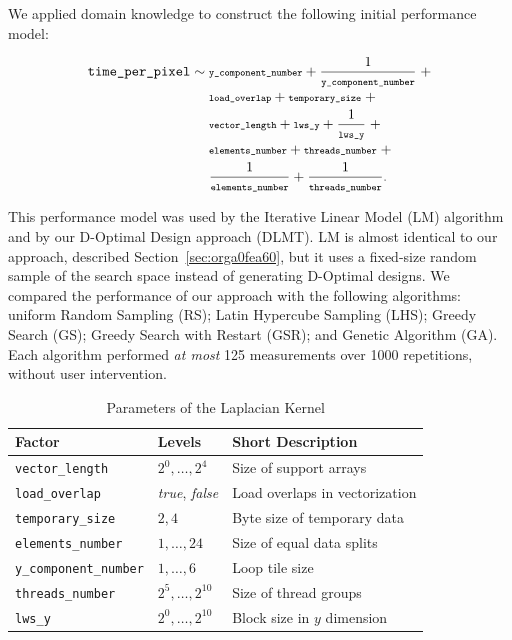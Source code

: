 \documentclass[conference]{IEEEtran}
\begin{document}
We applied domain knowledge to construct the following initial performance model:
\vspace{-2pt}
\\\begin{minipage}{\linewidth}\scriptsize
\begin{align}
\label{eq:gpu_laplacian_performance_model}
\texttt{time\_per\_pixel} \sim & \scriptsize\; \texttt{y\_component\_number} + \frac{1}{\texttt{y\_component\_number}} \; + \nonumber \\
& \scriptsize\; \texttt{load\_overlap} + \texttt{temporary\_size} \; + \nonumber \\
& \scriptsize\; \texttt{vector\_length} + \texttt{lws\_y} + \frac{1}{\texttt{lws\_y}} \; + \\
& \scriptsize\; \texttt{elements\_number} + \texttt{threads\_number}  \; + \nonumber \\
& \scriptsize\; \frac{1}{\texttt{elements\_number}} + \frac{1}{\texttt{threads\_number}}\text{.} \nonumber
\end{align}
\vspace{2pt}
\end{minipage}
This performance model was used by the Iterative Linear Model (LM) algorithm and
by our D-Optimal Design approach (DLMT). LM is almost identical to our approach,
described Section~\ref{sec:orga0fea60}, but it uses a
fixed-size random sample of the search space instead of generating D-Optimal
designs. We compared the performance of our approach with the following
algorithms: uniform Random Sampling (RS); Latin Hypercube Sampling (LHS); Greedy
Search (GS); Greedy Search with Restart (GSR); and Genetic Algorithm (GA). Each
algorithm performed \emph{at most} 125 measurements over 1000 repetitions, without
user intervention.

\begin{table}[t]
\caption{\label{tab:orgf6c9670}
Parameters of the Laplacian Kernel}
\centering
\scriptsize
\begin{tabular}{llp{}}
\toprule
Factor & Levels & Short Description\\
\midrule
\texttt{vector\_length} & \(2^0,\dots,2^4\) & Size of support arrays\\
\texttt{load\_overlap} & \textit{true}, \textit{false} & Load overlaps in vectorization\\
\texttt{temporary\_size} & \(2,4\) & Byte size of temporary data\\
\texttt{elements\_number} & \(1,\dots,24\) & Size of equal data splits\\
\texttt{y\_component\_number} & \(1,\dots,6\) & Loop tile size\\
\texttt{threads\_number} & \(2^5,\dots,2^{10}\) & Size of thread groups\\
\texttt{lws\_y} & \(2^0,\dots,2^{10}\) & Block size in \(y\) dimension\\
\bottomrule
\end{tabular}
\end{table}
\end{document}
